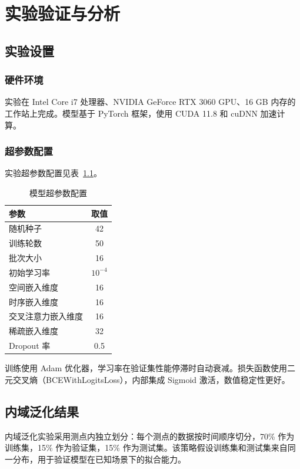 \chapter{实验验证与分析}

\section{实验设置}

\subsection{硬件环境}
实验在 Intel Core i7 处理器、NVIDIA GeForce RTX 3060 GPU、16 GB 内存的工作站上完成。模型基于 PyTorch 框架，使用 CUDA 11.8 和 cuDNN 加速计算。

\subsection{超参数配置}
实验超参数配置见表~\ref{tab:hyperparameters}。

\begin{table}[h]
\centering
\caption{模型超参数配置}
\label{tab:hyperparameters}
\begin{tabular}{lc}
\hline
参数 & 取值 \\
\hline
随机种子 & 42 \\
训练轮数 & 50 \\
批次大小 & 16 \\
初始学习率 & $10^{-4}$ \\
空间嵌入维度 & 16 \\
时序嵌入维度 & 16 \\
交叉注意力嵌入维度 & 16 \\
稀疏嵌入维度 & 32 \\
Dropout 率 & 0.5 \\
\hline
\end{tabular}
\end{table}

训练使用 Adam 优化器，学习率在验证集性能停滞时自动衰减。损失函数使用二元交叉熵（BCEWithLogitsLoss），内部集成 Sigmoid 激活，数值稳定性更好。

\section{内域泛化结果}

内域泛化实验采用测点内独立划分：每个测点的数据按时间顺序切分，70\% 作为训练集，15\% 作为验证集，15\% 作为测试集。该策略假设训练集和测试集来自同一分布，用于验证模型在已知场景下的拟合能力。

